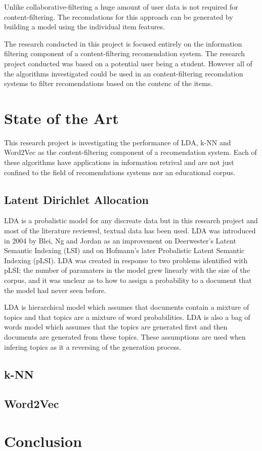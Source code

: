 Unlike collaborative-filtering a huge amount of user data is not required for content-filtering.
The recomdations for this approach can be generated by building a model using the individual item features.

The research conducted in this project is focused entirely on the information filtering component of a content-filtering recomendation system.
The research project conducted was based on a potential user being a student.
However all of the algorithms investigated could be used in an content-filtering recomdation systems to filter recomendations based on the contenc of the items.

\section{State of the Art}
This research project is investigating the performance of LDA, k-NN and Word2Vec as the content-filtering component of a recomendation system.
Each of these algorithms have applications in information retrival and are not just confined to the field of recomendations systems nor an educational corpus.

\subsection{Latent Dirichlet Allocation}
LDA is a probalistic model for any discreate data but in this research project and most of the literature reviewed, textual data has been used.
LDA was introduced in 2004 by Blei, Ng and Jordan as an improvement on Deerwester's Latent Semantic Indexing (LSI) and on Hofmann's later Probalistic Latent Semantic Indexing (pLSI).
LDA was created in response to two problems identified with pLSI; the number of paramaters in the model grew linearly with the size of the corpus, and it was unclear as to how to assign a probability to a document that the model had never seen before.

LDA is hierarchical model which assumes that documents contain a mixture of topics and that topics are a mixture of word probabilities.
LDA is also a bag of words model which assumes that the topics are generated first and then documents are generated from these topics.
These assumptions are used when infering topics as it a reversing of the generation process.

\subsection{k-NN}

\subsection{Word2Vec}

\section{Conclusion}

